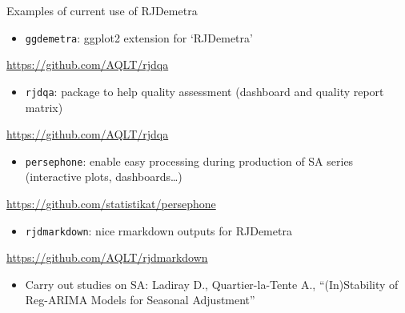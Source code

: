 \documentclass[10pt,xcolor=table,color={dvipsnames,usenames},ignorenonframetext,usepdftitle=false,french]{beamer}
\providecommand{\tightlist}{%
  \setlength{\parskip}{0pt}
  }
\begin{document}
\begin{frame}[fragile]{Examples of current use of RJDemetra}
\protect\hypertarget{examples-of-current-use-of-rjdemetra}{}

\begin{itemize}
\tightlist
\item
  \texttt{ggdemetra}: ggplot2 extension for `RJDemetra'
\end{itemize}

\faGithub{} \url{https://github.com/AQLT/rjdqa}

\begin{itemize}
\tightlist
\item
  \texttt{rjdqa}: package to help quality assessment (dashboard and
  quality report matrix)
\end{itemize}

\faGithub{} \url{https://github.com/AQLT/rjdqa}

\begin{itemize}
\tightlist
\item
  \texttt{persephone}: enable easy processing during production of SA
  series (interactive plots, dashboards\ldots{})
\end{itemize}

\faGithub{} \url{https://github.com/statistikat/persephone}

\begin{itemize}
\tightlist
\item
  \texttt{rjdmarkdown}: nice rmarkdown outputs for RJDemetra
\end{itemize}

\faGithub{} \url{https://github.com/AQLT/rjdmarkdown}

\begin{itemize}
\tightlist
\item
  Carry out studies on SA: Ladiray D., Quartier-la-Tente A.,
  ``(In)Stability of Reg-ARIMA Models for Seasonal Adjustment''
\end{itemize}

\end{frame}
\end{document}

